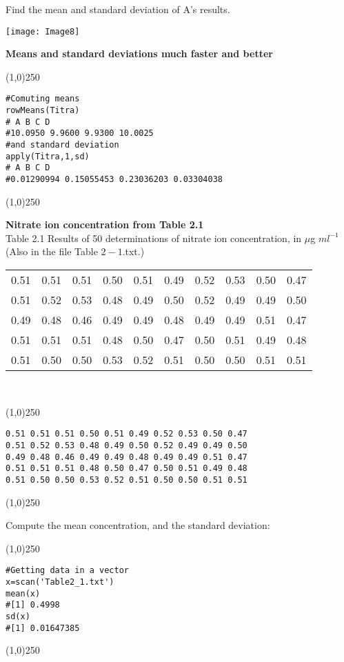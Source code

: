Find the mean and standard deviation of A's results.

\begin{center}
	\texttt{[image: Image8]}
\end{center}


\textbf{Means and standard deviations much faster and better}
\begin{center}
	\line(1,0){250}
\end{center}
\begin{verbatim}
#Comuting means
rowMeans(Titra)
# A B C D
#10.0950 9.9600 9.9300 10.0025
#and standard deviation
apply(Titra,1,sd)
# A B C D
#0.01290994 0.15055453 0.23036203 0.03304038
\end{verbatim}
\begin{center}
	\line(1,0){250}
\end{center}
\newpage
\textbf{Nitrate ion concentration from Table 2.1}\\
Table 2.1 Results of 50 determinations of nitrate ion concentration, in $\mu$g $ml^{-1}$ (Also in the file Table $2-1$.txt.) \\
\begin{tabular}{|c|c|c|c|c|c|c|c|c|c|}
	\hline
	0.51 &0.51 &0.51 &0.50 &0.51 &0.49 &0.52 &0.53 &0.50 &0.47\\
	0.51 &0.52 &0.53 &0.48 &0.49 &0.50 &0.52 &0.49 &0.49 &0.50\\
	0.49 &0.48 &0.46 &0.49 &0.49 &0.48 &0.49 &0.49 &0.51 &0.47\\
	0.51 &0.51 &0.51 &0.48 &0.50 &0.47 &0.50 &0.51 &0.49 &0.48\\
	0.51 &0.50 &0.50 &0.53 &0.52 &0.51 &0.50 &0.50 &0.51 &0.51\\
	\hline
\end{tabular}\\ \bigskip

\begin{center}
	\line(1,0){250}
\end{center}
\begin{verbatim}
0.51 0.51 0.51 0.50 0.51 0.49 0.52 0.53 0.50 0.47
0.51 0.52 0.53 0.48 0.49 0.50 0.52 0.49 0.49 0.50
0.49 0.48 0.46 0.49 0.49 0.48 0.49 0.49 0.51 0.47
0.51 0.51 0.51 0.48 0.50 0.47 0.50 0.51 0.49 0.48
0.51 0.50 0.50 0.53 0.52 0.51 0.50 0.50 0.51 0.51
\end{verbatim}
\begin{center}
	\line(1,0){250}
\end{center}
Compute the mean concentration, and the standard deviation:
\begin{center}
	\line(1,0){250}
\end{center}
\begin{verbatim}
#Getting data in a vector
x=scan('Table2_1.txt')
mean(x)
#[1] 0.4998
sd(x)
#[1] 0.01647385
\end{verbatim}
\begin{center}
	\line(1,0){250}
\end{center}
\newpage


